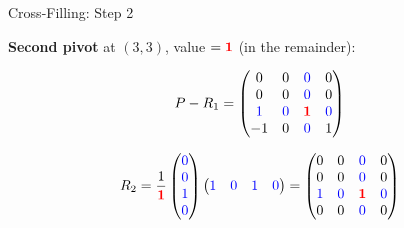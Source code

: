 \documentclass[10pt]{beamer}
\theoremstyle{definition}
\newcommand{\x}[1]{\alert{\textbf{#1}}}
\newcommand{\pvt}[1]{{\color{red}\mathbf{#1}}}       %
\newcommand{\crs}[1]{{\color{blue}#1}}                %
\begin{document}
\begin{frame}{Cross-Filling: Step 2}

\x{Second pivot} at $(3,3)$, value $= \pvt{1}$ (in the remainder):

$$P - R_1 = \begin{pmatrix} 0 & 0 & \crs{0} & 0 \\ 0 & 0 & \crs{0} & 0 \\ \crs{1} & \crs{0} & \pvt{1} & \crs{0} \\ -1 & 0 & \crs{0} & 1 \end{pmatrix}$$

$$R_2 = \frac{1}{\pvt{1}}\begin{pmatrix} \crs{0} \\ \crs{0} \\ \crs{1} \\ \crs{0} \end{pmatrix} \begin{pmatrix} \crs{1} & \crs{0} & \crs{1} & \crs{0} \end{pmatrix}
= \begin{pmatrix} 0 & 0 & \crs{0} & 0 \\ 0 & 0 & \crs{0} & 0 \\ \crs{1} & \crs{0} & \pvt{1} & \crs{0} \\ 0 & 0 & \crs{0} & 0 \end{pmatrix}$$

\end{frame}
\end{document}
